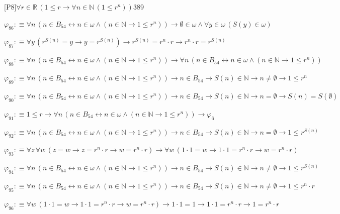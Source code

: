 \begin{fullproof}{[P8]}{$\forall r \in \mathbb{R}\,(1 \leq r \to \forall n \in \mathbb{N}\,(1 \leq {{r}^{n}}))$}{389}
\begin{abbrevlist}
\item $\varphi_{86} :\equiv \forall n\,(n \in B_{54} \leftrightarrow n \in \omega \land (n \in \mathbb{N} \to 1 \leq {{r}^{n}})) \to \emptyset \in \omega \land \forall y \in \omega\,(S(y) \in \omega)$
\item $\varphi_{87} :\equiv \forall y\,({{r}^{S(n)}} = y \to y = {{r}^{S(n)}}) \to {{r}^{S(n)}} = {{r}^{n}} \cdot r \to {{r}^{n}} \cdot r = {{r}^{S(n)}}$
\item $\varphi_{88} :\equiv \forall n\,(n \in B_{54} \leftrightarrow n \in \omega \land (n \in \mathbb{N} \to 1 \leq {{r}^{n}})) \to \forall n\,(n \in B_{54} \leftrightarrow n \in \omega \land (n \in \mathbb{N} \to 1 \leq {{r}^{n}}))$
\item $\varphi_{89} :\equiv \forall n\,(n \in B_{54} \leftrightarrow n \in \omega \land (n \in \mathbb{N} \to 1 \leq {{r}^{n}})) \to n \in B_{54} \to S(n) \in \mathbb{N} \to n \neq \emptyset \to 1 \leq {{r}^{n}}$
\item $\varphi_{90} :\equiv \forall n\,(n \in B_{54} \leftrightarrow n \in \omega \land (n \in \mathbb{N} \to 1 \leq {{r}^{n}})) \to n \in B_{54} \to S(n) \in \mathbb{N} \to n = \emptyset \to S(n) = S(\emptyset)$
\item $\varphi_{91} :\equiv 1 \leq r \to \forall n\,(n \in B_{54} \leftrightarrow n \in \omega \land (n \in \mathbb{N} \to 1 \leq {{r}^{n}})) \to \varphi_{6}$
\item $\varphi_{92} :\equiv \forall n\,(n \in B_{54} \leftrightarrow n \in \omega \land (n \in \mathbb{N} \to 1 \leq {{r}^{n}})) \to n \in B_{54} \to S(n) \in \mathbb{N} \to n = \emptyset \to 1 \leq {{r}^{S(n)}}$
\item $\varphi_{93} :\equiv \forall z\,\forall w\,(z = w \to z = {{r}^{n}} \cdot r \to w = {{r}^{n}} \cdot r) \to \forall w\,(1 \cdot 1 = w \to 1 \cdot 1 = {{r}^{n}} \cdot r \to w = {{r}^{n}} \cdot r)$
\item $\varphi_{94} :\equiv \forall n\,(n \in B_{54} \leftrightarrow n \in \omega \land (n \in \mathbb{N} \to 1 \leq {{r}^{n}})) \to n \in B_{54} \to S(n) \in \mathbb{N} \to n \neq \emptyset \to 1 \leq {{r}^{S(n)}}$
\item $\varphi_{95} :\equiv \forall n\,(n \in B_{54} \leftrightarrow n \in \omega \land (n \in \mathbb{N} \to 1 \leq {{r}^{n}})) \to n \in B_{54} \to S(n) \in \mathbb{N} \to n \neq \emptyset \to 1 \leq {{r}^{n}} \cdot r$
\item $\varphi_{96} :\equiv \forall w\,(1 \cdot 1 = w \to 1 \cdot 1 = {{r}^{n}} \cdot r \to w = {{r}^{n}} \cdot r) \to 1 \cdot 1 = 1 \to 1 \cdot 1 = {{r}^{n}} \cdot r \to 1 = {{r}^{n}} \cdot r$

\end{abbrevlist}
\end{fullproof}
